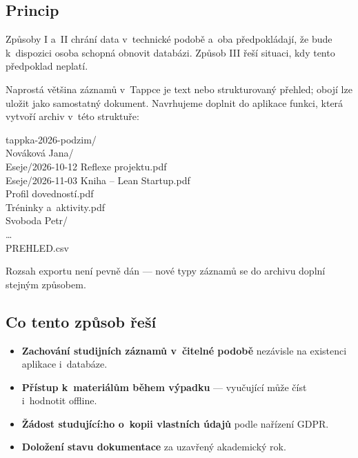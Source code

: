 \documentclass[11pt,a4paper]{article}
\begin{document}
\subsection{Princip}

Způsoby I a~II chrání data v~technické podobě a~oba předpokládají, že bude k~dispozici osoba
schopná obnovit databázi. Způsob III řeší situaci, kdy tento předpoklad neplatí.

Naprostá většina záznamů v~Tappce je text nebo strukturovaný přehled; obojí lze uložit jako
samostatný dokument. Navrhujeme doplnit do aplikace funkci, která vytvoří archiv v~této
struktuře:

\begin{tcolorbox}[colback=tapmuted, colframe=tapline, boxrule=0.6pt, arc=3pt,
                  left=11pt, right=11pt, top=8pt, bottom=8pt]
\ttfamily\small
tappka-2026-podzim/\\
\hspace*{1.4em}Nováková Jana/\\
\hspace*{2.8em}Eseje/2026-10-12 Reflexe projektu.pdf\\
\hspace*{2.8em}Eseje/2026-11-03 Kniha -- Lean Startup.pdf\\
\hspace*{2.8em}Profil dovedností.pdf\\
\hspace*{2.8em}Tréninky a~aktivity.pdf\\
\hspace*{1.4em}Svoboda Petr/\\
\hspace*{2.8em}\dots\\
\hspace*{1.4em}PREHLED.csv
\end{tcolorbox}

Rozsah exportu není pevně dán --- nové typy záznamů se do archivu doplní stejným způsobem.

\subsection{Co tento způsob řeší}

\begin{itemize}
  \item \textbf{Zachování studijních záznamů v~čitelné podobě} nezávisle na existenci
        aplikace i~databáze.
  \item \textbf{Přístup k~materiálům během výpadku} --- vyučující může číst i~hodnotit offline.
  \item \textbf{Žádost studující:ho o~kopii vlastních údajů} podle nařízení GDPR.
  \item \textbf{Doložení stavu dokumentace} za uzavřený akademický rok.
\end{itemize}
\end{document}
